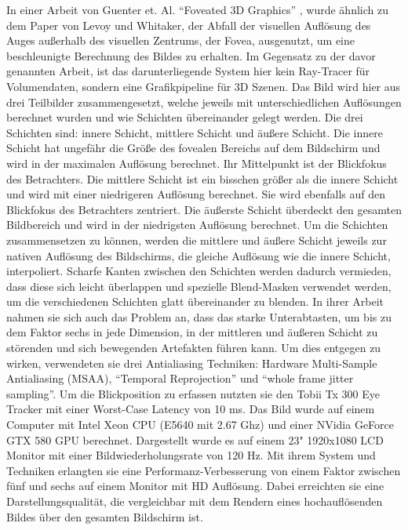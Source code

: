In einer Arbeit von Guenter et. Al. \enquote{Foveated 3D Graphics} \cite{foveated-3d-graphics}, wurde ähnlich zu dem Paper von Levoy und Whitaker, der Abfall der visuellen Auflösung des Auges außerhalb des visuellen Zentrums, der Fovea, ausgenutzt, um eine beschleunigte Berechnung des Bildes zu erhalten.
Im Gegensatz zu der davor genannten Arbeit, ist das darunterliegende System hier kein Ray-Tracer für Volumendaten, sondern eine Grafikpipeline für 3D Szenen.
Das Bild wird hier aus drei Teilbilder zusammengesetzt, welche jeweils mit unterschiedlichen Auflösungen berechnet wurden und wie Schichten übereinander gelegt werden.
Die drei Schichten sind: innere Schicht, mittlere Schicht und äußere Schicht.
Die innere Schicht hat ungefähr die Größe des fovealen Bereichs auf dem Bildschirm und wird in der maximalen Auflösung berechnet.
Ihr Mittelpunkt ist der Blickfokus des Betrachters.
Die mittlere Schicht ist ein bisschen größer als die innere Schicht und wird mit einer niedrigeren Auflösung berechnet. 
Sie wird ebenfalls auf den Blickfokus des Betrachters zentriert.
Die äußerste Schicht überdeckt den gesamten Bildbereich und wird in der niedrigsten Auflösung berechnet.
Um die Schichten zusammensetzen zu können, werden die mittlere und äußere Schicht jeweils zur nativen Auflösung des Bildschirms, die gleiche Auflösung wie die innere Schicht, interpoliert.
Scharfe Kanten zwischen den Schichten werden dadurch vermieden, dass diese sich leicht überlappen und spezielle Blend-Masken verwendet werden, um die verschiedenen Schichten glatt übereinander zu blenden.
In ihrer Arbeit nahmen sie sich auch das Problem an, dass das starke Unterabtasten, um bis zu dem Faktor sechs in jede Dimension, in der mittleren und äußeren Schicht zu störenden und sich bewegenden Artefakten führen kann.
Um dies entgegen zu wirken, verwendeten sie drei Antialiasing Techniken: Hardware Multi-Sample Antialiasing (MSAA), \enquote{Temporal Reprojection} und \enquote{whole frame jitter sampling}.
Um die Blickposition zu erfassen nutzten sie den Tobii Tx 300 Eye Tracker mit einer Worst-Case Latency von 10 ms.
Das Bild wurde auf einem Computer mit Intel Xeon CPU (E5640 mit 2.67 Ghz) und einer NVidia GeForce GTX 580 GPU berechnet.
Dargestellt wurde es auf einem 23" 1920x1080 LCD Monitor mit einer Bildwiederholungsrate von 120 Hz.
Mit ihrem System und Techniken erlangten sie eine Performanz-Verbesserung von einem Faktor zwischen fünf und sechs auf einem Monitor mit HD Auflösung.
Dabei erreichten sie eine Darstellungsqualität, die vergleichbar mit dem Rendern eines hochauflösenden Bildes über den gesamten Bildschirm ist.

